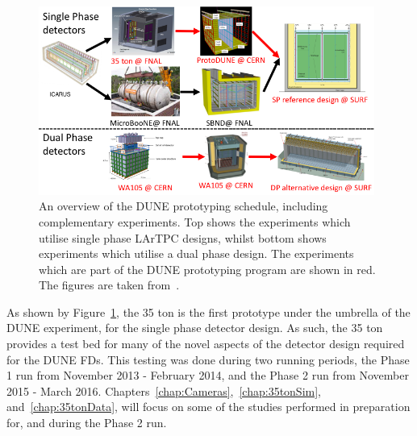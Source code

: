 \begin{figure}
  \centering
  \includegraphics[width=0.98\textwidth]{PrototypeSched}
  \caption[An overview of the DUNE prototyping schedule, including complementary experiments]
          {An overview of the DUNE prototyping schedule, including complementary experiments. Top shows the experiments which utilise single phase LArTPC designs, whilst bottom shows experiments which utilise a dual phase design. The experiments which are part of the DUNE prototyping program are shown in red. The figures are taken from~\citep{MarkReviewJuly2015, DUNECDR_V4}.}
  \label{fig:DUNEProtSched}
\end{figure}

As shown by Figure~\ref{fig:DUNEProtSched}, the 35 ton is the first prototype under the umbrella of the DUNE experiment, for the single phase detector design. As such, the 35 ton provides a test bed for many of the novel aspects of the detector design required for the DUNE FDs. This testing was done during two running periods, the Phase 1 run from November 2013 - February 2014, and the Phase 2 run from November 2015 - March 2016. Chapters~\ref{chap:Cameras},~\ref{chap:35tonSim}, and~\ref{chap:35tonData}, will focus on some of the studies performed in preparation for, and during the Phase 2 run. \\ 

